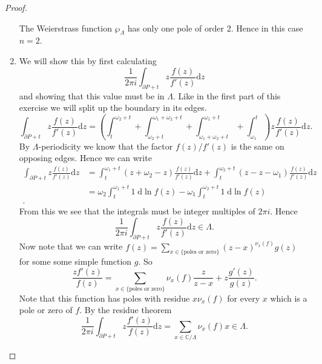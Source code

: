 \documentclass[a4paper]{article}
\theoremstyle{theoremdd}
\theoremstyle{definitiondd}
\theoremstyle{remarkdd}
\newcommand{\C}{\mathbb{C}}
\begin{document}
\begin{proof}
\begin{enumerate}
The Weierstrass function $\wp_{\Lambda}$ has only one pole of order 2. Hence in this case  $n = 2$.
\item 
	We will show this by first calculating \[
		\frac{1}{2\pi i}\int_{\partial P + t} z \frac{f(z)}{f'(z)} \mathrm d z
	\]
	and showing that this value must be in $\Lambda$.
	Like in the first part of this exercise we will split up the boundary in its edges.
	\[	
		\int_{\partial P+ t} z \frac{f(z)}{f'(z)} \mathrm d z = \left(\int_t^{\omega_2 + t} + \int_{\omega_2+t}^{\omega_1 + \omega_2 + t} + \int_{\omega_1 + \omega_2 + t} ^{\omega_1 + t} + \int_{\omega_1}^{t}\right) z \frac{f(z)}{f'(z)} \mathrm dz
	.\]
	By $\Lambda$-periodicity we know that the factor $f(z) / f'(z)$ is the same on opposing edges. Hence we can write \begin{align*}
		\int_{\partial P + t} z \frac{f(z)}{f'(z)} \mathrm d z &= \int_t^{\omega_1 + t} (z + \omega_2 - z) \frac{f(z)}{f'(z)} \mathrm d z + \int_{t}^{\omega_2 + t} (z - z - \omega_1) \frac{f(z)}{f'(z)} \mathrm d z\\
								       &= \omega_2 \int_t^{\omega_1 + t} 1 \; \mathrm d \ln f(z) - \omega_1 \int_t^{\omega_2 +t} 1 \; \mathrm d \ln f(z) \\
	.\end{align*} 
	From this we see that the integrals must be integer multiples of  $2\pi i$. 
	Hence 
	\[
		\frac{1}{2\pi i } \int_{\partial P + t} z \frac{f(z)}{f'(z)} \mathrm d z \in \Lambda
	.\] 
	Now note that we can write $f(z) = \sum_{x \in \{\text{poles or zero}\} }(z - x)^{\nu_x(f)}g(z)$ for some some simple function $g$. 
	So \[
		\frac{zf'(z)}{f(z)} = \sum_{x \in \{\text{poles or zero}\} }\nu_x(f) \frac{z}{ z - x} + z \frac{g'(z)}{g(z)}
	.\] 
	Note that this function has poles with residue $x \nu_x(f)$ for every $x$ which is a pole or zero of  $f$. By the residue theorem  \[
		\frac{1}{2\pi i} \int_{\partial P + t} z \frac{f'(z)}{f(z)} \mathrm d z = \sum_{x \in \C / \Lambda} \nu_x(f)  x \in \Lambda 
	.\]  
\end{enumerate}
\end{proof}
\printbibliography
\end{document}
